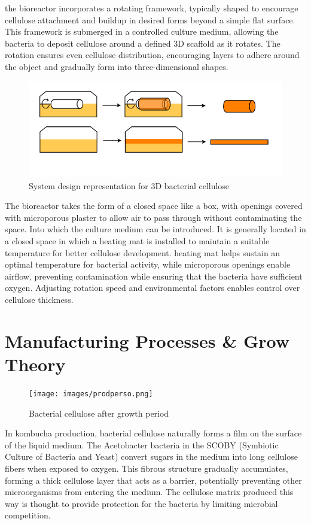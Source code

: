 the bioreactor incorporates a rotating framework, typically shaped to encourage cellulose attachment and buildup in desired forms beyond a simple flat surface. This framework is submerged in a controlled culture medium, allowing the bacteria to deposit cellulose around a defined 3D scaffold as it rotates. The rotation ensures even cellulose distribution, encouraging layers to adhere around the object and gradually form into three-dimensional shapes.
\begin{figure}[h]
    \centering
    \includegraphics{images/shema3Dscoby.png}
    \caption{System design representation for 3D bacterial cellulose}
    \label{fig:diagBC3D}
\end{figure} 

The bioreactor takes the form of a closed space like a box, with openings covered with microporous plaster to allow air to pass through without contaminating the space. Into which the culture medium can be introduced.
It is generally located in a closed space in which a heating mat is installed to maintain a suitable temperature for better cellulose development. 
heating mat helps sustain an optimal temperature for bacterial activity, while microporous openings enable airflow, preventing contamination while ensuring that the bacteria have sufficient oxygen. Adjusting rotation speed and environmental factors enables control over cellulose thickness.


\section{Manufacturing Processes \& Grow Theory}


\begin{figure}[h]
    \centering
    \texttt{[image: images/prodperso.png]}
    \caption{Bacterial cellulose after growth period}
    \label{fig:manufactureperso}
\end{figure} 

In kombucha production, bacterial cellulose naturally forms a film on the surface of the liquid medium. The Acetobacter bacteria in the SCOBY (Symbiotic Culture of Bacteria and Yeast) convert sugars in the medium into long cellulose fibers when exposed to oxygen. This fibrous structure gradually accumulates, forming a thick cellulose layer that acts as a barrier, potentially preventing other microorganisms from entering the medium. The cellulose matrix produced this way is thought to provide protection for the bacteria by limiting microbial competition.

